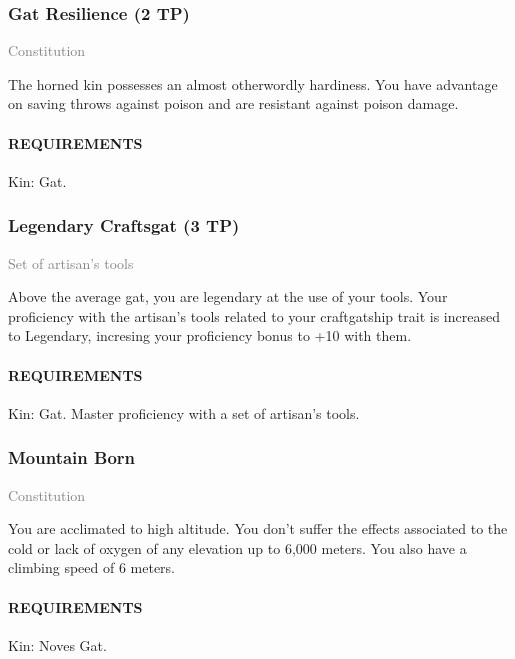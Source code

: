     \subsubsection{Gat Resilience (2 TP)} \label{feat::gatresilience}
    \small{\textcolor{gray}{Constitution}}

    \normalsize
    The horned kin possesses an almost otherwordly hardiness.
    You have advantage on saving throws against poison and are resistant against poison damage.
    \paragraph{REQUIREMENTS} Kin: Gat.

    \subsubsection{Legendary Craftsgat (3 TP)} \label{feat::legendarycraftsgat}
    \small{\textcolor{gray}{Set of artisan's tools}}

    \normalsize
    Above the average gat, you are legendary at the use of your tools.
    Your proficiency with the artisan's tools related to your craftgatship trait is increased to Legendary, incresing your proficiency bonus to +10 with them.
    \paragraph{REQUIREMENTS} Kin: Gat. Master proficiency with a set of artisan's tools.

    \subsubsection{Mountain Born} \label{feat::mountainborn}
    \small{\textcolor{gray}{Constitution}}

    \normalsize
    You are acclimated to high altitude.
    You don't suffer the effects associated to the cold or lack of oxygen of any elevation up to 6,000 meters.
    You also have a climbing speed of 6 meters.
    \paragraph{REQUIREMENTS} Kin: Noves Gat.

